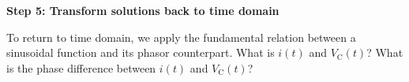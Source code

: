 \begin{enumerate}


\qitem \textbf{Step 5: Transform solutions back to time domain}

To return to time domain, we apply the fundamental relation between a sinusoidal function and its phasor counterpart.
What is $i(t)$ and $V_{\text{C}}(t)$? What is the phase difference between $i(t)$ and $V_{\text{C}}(t)$? 

\ws{\vspace{100px}}



\end{enumerate}

